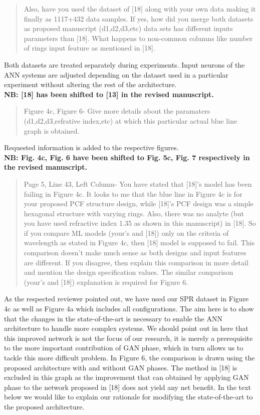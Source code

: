 \documentclass{article}
\begin{document}
	\begin{quote}
	Also, have you used the dataset of [18] along with your own data making it finally as 1117+432 data samples. If yes, how did you merge both datasets as proposed manuscript (d1,d2,d3,etc) data sets has different inputs parameters than [18]. What happens to non-common columns like number of rings input feature as mentioned in [18].
	\end{quote}
	
	Both datasets are treated separately during experiments. Input neurons of the ANN systems are adjusted depending on the dataset used in a particular experiment without altering the rest of the architecture.\\
	\textbf{NB: [18] has been shifted to [13] in the revised manuscript.}
	
	
	\begin{quote}
	Figure 4c, Figure 6- Give more details about the paramaters (d1,d2,d3,refrative index,etc) at which this particular actual blue line graph is obtained.
	\end{quote}

	Requested information is added to the respective figures.\\
	\textbf{NB: Fig. 4c, Fig. 6 have been shifted to Fig. 5c, Fig. 7 respectively in the revised manuscript.}
	
	
	\begin{quote}
	Page 5, Line 43, Left Column- You have stated that [18]'s model has been failing in Figure 4c. It looks to me that the blue line in Figure 4c is for your proposed PCF structure design, while [18]'s PCF design was a simple hexagonal structure with varying rings. Also, there was no analyte (but you have used refractive index 1.35 as shown in this manuscript) in [18]. So if you compare ML models (your's and [18]) only on the criteria of wavelength as stated in Figure 4c, then [18] model is supposed to fail. This comparison doesn't make much sense as both designs and input features are different. If you disagree, then explain this comparison in more detail and mention the design specification values.
	The similar comparison (your's and [18]) explanation is required for Figure 6.
	\end{quote}
	
	As the respected reviewer pointed out, we have used our SPR dataset in Figure 4c as well as Figure 4a which includes all configurations. The aim here is to show that the changes in the state-of-the-art is necessary to enable the ANN architecture to handle more complex systems. We should point out in here that this improved network is not the focus of our research, it is merely a prerequisite to the more important contribution of GAN phase, which in turn allows us to tackle this more difficult problem. In Figure 6, the comparison is drawn using the proposed architecture with and without GAN phases. The method in [18] is excluded in this graph as the improvement that can obtained by applying GAN phase to the network proposed in [18] does not yield any net benefit. In the text below we would like to explain our rationale for modifying the state-of-the-art to the proposed architecture.
	
\end{document}
